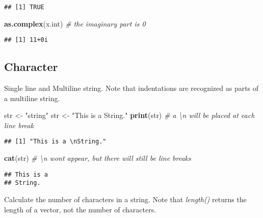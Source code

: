 \documentclass[
  12pt,
]{article}
\newenvironment{Shaded}{\begin{snugshade}}{\end{snugshade}}
\newcommand{\CommentTok}[1]{\textcolor[rgb]{0.56,0.35,0.01}{\textit{#1}}}
\newcommand{\FunctionTok}[1]{\textcolor[rgb]{0.13,0.29,0.53}{\textbf{#1}}}
\newcommand{\NormalTok}[1]{#1}
\newcommand{\OtherTok}[1]{\textcolor[rgb]{0.56,0.35,0.01}{#1}}
\newcommand{\StringTok}[1]{\textcolor[rgb]{0.31,0.60,0.02}{#1}}
\begin{document}
\begin{verbatim}
## [1] TRUE
\end{verbatim}

\begin{Shaded}
\begin{Highlighting}[]
\FunctionTok{as.complex}\NormalTok{(x.int)  }\CommentTok{\# the imaginary part is 0}
\end{Highlighting}
\end{Shaded}

\begin{verbatim}
## [1] 11+0i
\end{verbatim}

\newpage
\subsection{Character}
\label{sec:VAR-character}

Single line and Multiline string. Note that indentations are recognized
as parts of a multiline string.

\begin{Shaded}
\begin{Highlighting}[]
\NormalTok{str }\OtherTok{\textless{}{-}} \StringTok{"string"}
\NormalTok{str }\OtherTok{\textless{}{-}} \StringTok{"This is a }
\StringTok{String."}
\FunctionTok{print}\NormalTok{(str)    }\CommentTok{\# a \textquotesingle{}\textbackslash{}n\textquotesingle{} will be placed at each line break}
\end{Highlighting}
\end{Shaded}

\begin{verbatim}
## [1] "This is a \nString."
\end{verbatim}

\begin{Shaded}
\begin{Highlighting}[]
\FunctionTok{cat}\NormalTok{(str)      }\CommentTok{\# \textquotesingle{}\textbackslash{}n\textquotesingle{} won\textquotesingle{}t appear, but there will still be line breaks}
\end{Highlighting}
\end{Shaded}

\begin{verbatim}
## This is a 
## String.
\end{verbatim}

Calculate the number of characters in a string. Note that
\textit{length()} returns the length of a vector, not the number of
characters.
\end{document}
